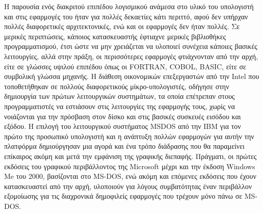 \documentclass[
]{article}
\begin{document}
Η παρουσία ενός διακριτού επιπέδου λογισμικού ανάμεσα στο υλικό του
υπολογιστή και στις εφαρμογές του ήταν για πολλές δεκαετίες κάτι
περιττό, αφού δεν υπήρχαν πολλές διαφορετικές αρχιτεκτονικές, ενώ και οι
εφαρμογές δεν ήταν πολλές. Σε μερικές περιπτώσεις, κάποιος κατασκευαστής
έφτιαχνε μερικές βιβλιοθήκες προγραμματισμού, έτσι ώστε να μην
χρειάζεται να υλοποιεί συνέχεια κάποιες βασικές λειτουργίες, αλλά στην
πράξη, οι περισσότερες εφαρμογές φτιάχνονταν από την αρχή, είτε σε
γλώσσες υψιλού επιπέδου όπως οι FORTRAN, COBOL, BASIC, είτε σε συμβολική
γλώσσα μηχανής. Η διάθεση οικονομικών επεξεργαστών από την Intel που
τοποθετήθηκαν σε πολλούς διαφορετικούς μίκρο-υπολογιστές, οδήγησε στην
δημιουργία των πρώτων λειτουργικών συστημάτων, τα οποία επέτρεπαν στους
προγραμματιστές να εστιάσουν στις λειτουργίες της εφαρμογής τους, χωρίς
να νοιάζονται για την πρόσβαση στον δίσκο και στις βασικές συσκευές
εισόδου και εξόδου. Η επιλογή του λειτουργικού συστήματος MSDOS από την
IBM για τον πρώτο της προσωπικό υπολογιστή και η ανάπτυξη πολλών
εφαρμογών για αυτήν την πλατφόρμα δημιούργησαν μια αγορά και ένα τρόπο
διάδρασης που θα παραμείνει επίκαιρος ακόμη και μετά την εμφάνιση της
γραφικής διεπαφής. Πράγματι, οι πρώτες εκδόσεις του γραφικού
περιβάλλοντος της Microsoft μέχρι και την έκδοση Windows Me του 2000,
βασίζονται στο MS-DOS, ενώ ακόμη και επόμενες εκδόσεις που έχουν
κατασκευαστεί από την αρχή, υλοποιούν για λόγους συμβατότητας έναν
περιβάλλον εξομοίωσης για τις διαχρονικά δημοφιλείς εφαρμογές που
τρέχουν μόνο πάνω σε MS-DOS.
\end{document}
